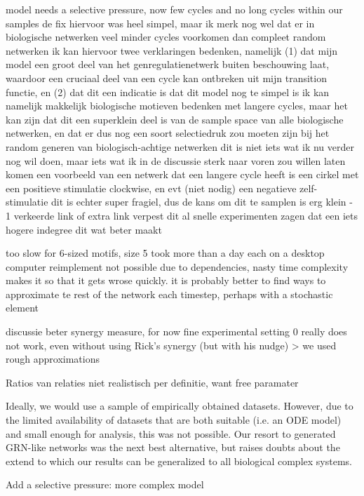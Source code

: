 \documentclass[../main.tex]{subfiles}
\begin{document}
model needs a selective pressure, now few cycles and no long cycles within our samples
de fix hiervoor was heel simpel, maar ik merk nog wel dat er in biologische netwerken veel minder cycles voorkomen dan compleet random netwerken
ik kan hiervoor twee verklaringen bedenken, namelijk (1) dat mijn model een groot deel van het genregulatienetwerk buiten beschouwing laat, waardoor een cruciaal deel van een cycle kan ontbreken uit mijn transition functie, en (2) dat dit een indicatie is dat dit model nog te simpel is
ik kan namelijk makkelijk biologische motieven bedenken met langere cycles, maar het kan zijn dat dit een superklein deel is van de sample space van alle biologische netwerken, en dat er dus nog een soort selectiedruk zou moeten zijn bij het random generen van biologisch-achtige netwerken
dit is niet iets wat ik nu verder nog wil doen, maar iets wat ik in de discussie sterk naar voren zou willen laten komen
een voorbeeld van een netwerk dat een langere cycle heeft is een cirkel met een positieve stimulatie clockwise, en evt (niet nodig) een negatieve zelf-stimulatie
dit is echter super fragiel, dus de kans om dit te samplen is erg klein - 1 verkeerde link of extra link verpest dit al
snelle experimenten zagen dat een iets hogere indegree dit wat beter maakt

too slow for 6-sized motifs, size 5 took more than a day each on a desktop computer
reimplement not possible due to dependencies, nasty time complexity makes it so that it gets wrose quickly.
it is probably better to find ways to approximate te rest of the network each timestep, perhaps with a stochastic element

discussie beter synergy measure, for now fine
experimental setting 0 really does not work, even without using Rick's synergy (but with his nudge) > we used rough approximations

Ratios van relaties niet realistisch per definitie, want free paramater

Ideally, we would use a sample of empirically obtained datasets.
However, due to the limited availability of datasets that are both suitable (i.e. an ODE model) and small enough for analysis, this was not possible.
Our resort to generated GRN-like networks was the next best alternative, but raises doubts about the extend to which our results can be generalized to all biological complex systems.

Add a selective pressure: more complex model
\end{document}
